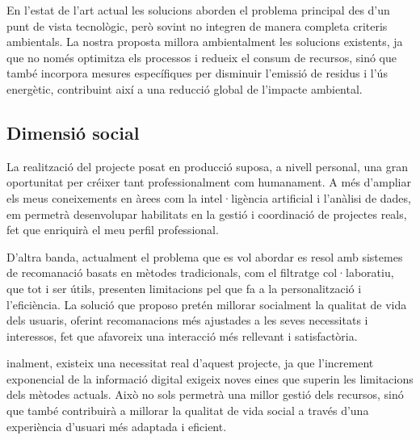 \documentclass[a4paper,12pt]{report}
\begin{document}
En l’estat de l’art actual les solucions aborden el problema principal des d’un punt de vista tecnològic, però sovint no integren de manera completa criteris ambientals. La nostra proposta millora ambientalment les solucions existents, ja que no només optimitza els processos i redueix el consum de recursos, sinó que també incorpora mesures específiques per disminuir l’emissió de residus i l’ús energètic, contribuint així a una reducció global de l’impacte ambiental.

\subsection{Dimensió social}

La realització del projecte posat en producció suposa, a nivell personal, una gran oportunitat per créixer tant professionalment com humanament. A més d’ampliar els meus coneixements en àrees com la intel·ligència artificial i l’anàlisi de dades, em permetrà desenvolupar habilitats en la gestió i coordinació de projectes reals, fet que enriquirà el meu perfil professional.

D’altra banda, actualment el problema que es vol abordar es resol amb sistemes de recomanació basats en mètodes tradicionals, com el filtratge col·laboratiu, que tot i ser útils, presenten limitacions pel que fa a la personalització i l’eficiència. La solució que proposo pretén millorar socialment la qualitat de vida dels usuaris, oferint recomanacions més ajustades a les seves necessitats i interessos, fet que afavoreix una interacció més rellevant i satisfactòria.

inalment, existeix una necessitat real d’aquest projecte, ja que l’increment exponencial de la informació digital exigeix noves eines que superin les limitacions dels mètodes actuals. Això no sols permetrà una millor gestió dels recursos, sinó que també contribuirà a millorar la qualitat de vida social a través d’una experiència d’usuari més adaptada i eficient.


\printbibliography[heading=bibintoc]
\end{document}
